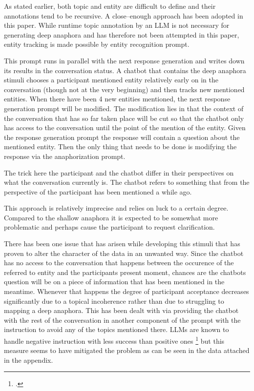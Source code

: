 \documentclass[12pt]{report}
\begin{document}
{\par
As stated earlier,
both topic and entity are difficult to define
and their annotations tend to be recursive.
A close–enough approach has been adopted in this paper.
While runtime topic annotation by an LLM
is not necessary for generating deep anaphora
and has therefore not been attempted in this paper,
entity tracking is made possible by
entity recognition prompt.

This prompt runs in parallel with the next response generation
and writes down its results in the conversation status.
A chatbot that contains the deep anaphora stimuli
chooses a participant mentioned entity
relatively early on in the conversation
(though not at the very beginning)
and then tracks new mentioned entities.
When there have been 4 new entities mentioned,
the next response generation prompt will be modified.
The modification lies in that the context of the conversation
that has so far taken place
will be cut so
that the chatbot only has access
to the conversation until the point of the mention of the entity.
Given the response generation prompt
the response will contain a question
about the mentioned entity.
Then the only thing that needs to be done
is modifying the response via the anaphorization prompt.

The trick here the participant and the chatbot differ in their perspectives
on what the conversation currently is.
The chatbot refers to something
that from the perspective of the participant
has been mentioned a while ago.

This approach is relatively imprecise and relies on luck to a certain degree.
Compared to the shallow anaphora
it is expected to be somewhat more problematic
and perhaps cause the participant to request clarification.

\par
There has been one issue that has arisen while developing this stimuli
that has proven to alter the character of the data in an unwanted way.
Since the chatbot has no access to the conversation that happens
between the occurence of the referred to entity and the participants present moment,
chances are the chatbots question will be on
a piece of information that has been mentioned in the meantime.
Whenever that happens the degree of participant acceptance decreases significantly
due to a topical incoherence rather than
due to struggling to mapping a deep anaphora.
This has been dealt with via providing the chatbot
with the rest of the conversation in another component of the prompt
with the instruction to avoid any of the topics mentioned there.
LLMs are known to handle negative instruction with less success than positive ones \footcite{negated_prompts}
but this measure seems to have mitigated the problem
as can be seen in the data attached in the appendix.

}
\end{document}
